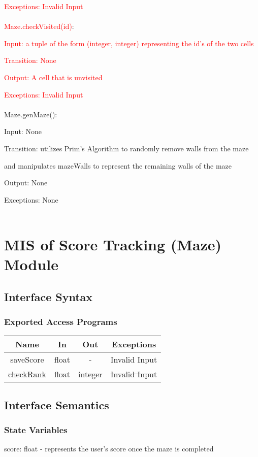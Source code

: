 \documentclass[12pt, titlepage]{article}
\begin{document}
		\textcolor{red}{Exceptions: Invalid Input}\\
        \\
        \textcolor{red}{Maze.checkVisited(id)}:
		
		\textcolor{red}{Input: a tuple of the form (integer, integer) representing the id's of the two cells}
		
		\textcolor{red}{Transition: None}
		
		\textcolor{red}{Output: A cell that is unvisited}
		
		\textcolor{red}{Exceptions: Invalid Input}\\
        \\
		Maze.genMaze():
		
		Input: None
		
		Transition: utilizes Prim's Algorithm to randomly remove walls from the maze 
		
		and manipulates mazeWalls to represent the remaining walls of the maze
		
		Output: None
		
		Exceptions: None\\
        \\
\section{MIS of Score Tracking (Maze) Module}
		\subsection{Interface Syntax}
		\subsubsection{Exported Access Programs}
		\begin{tabular}[pos]{|c|c|c|c|}
			\hline
			\textbf{Name}& \textbf{In} & \textbf{Out} & \textbf{Exceptions} \\ \hline
			saveScore & float & - & Invalid Input \\ \hline
			\sout{checkRank} & \sout{float} & \sout{integer} & \sout{Invalid Input} \\ \hline
		\end{tabular}
		
		\subsection{Interface Semantics}
		\subsubsection{State Variables}
		score: float - represents the user's score once the maze is completed
\end{document}
